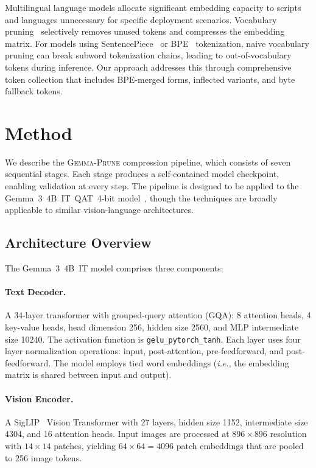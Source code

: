 \documentclass[11pt]{article}
\newcommand{\ie}{\textit{i.e.}}
\newcommand{\gemma}{\textsc{Gemma-Prune}}
\begin{document}
Multilingual language models allocate significant embedding capacity to scripts and languages unnecessary for specific deployment scenarios. Vocabulary pruning~\citep{vocabpruning} selectively removes unused tokens and compresses the embedding matrix. For models using SentencePiece~\citep{sentencepiece} or BPE~\citep{bpe} tokenization, naive vocabulary pruning can break subword tokenization chains, leading to out-of-vocabulary tokens during inference. Our approach addresses this through comprehensive token collection that includes BPE-merged forms, inflected variants, and byte fallback tokens.

\section{Method}
\label{sec:method}

We describe the \gemma{} compression pipeline, which consists of seven sequential stages. Each stage produces a self-contained model checkpoint, enabling validation at every step. The pipeline is designed to be applied to the Gemma~3~4B~IT~QAT~4-bit model~\citep{gemma3}, though the techniques are broadly applicable to similar vision-language architectures.

\subsection{Architecture Overview}
\label{sec:arch}

The Gemma~3~4B~IT model comprises three components:

\paragraph{Text Decoder.} A 34-layer transformer with grouped-query attention (GQA): 8 attention heads, 4 key-value heads, head dimension 256, hidden size 2560, and MLP intermediate size 10240. The activation function is \texttt{gelu\_pytorch\_tanh}. Each layer uses four layer normalization operations: input, post-attention, pre-feedforward, and post-feedforward. The model employs tied word embeddings (\ie, the embedding matrix is shared between input and output).

\paragraph{Vision Encoder.} A SigLIP~\citep{siglip} Vision Transformer with 27 layers, hidden size 1152, intermediate size 4304, and 16 attention heads. Input images are processed at $896\times896$ resolution with $14\times14$ patches, yielding $64\times64 = 4096$ patch embeddings that are pooled to 256 image tokens.
\end{document}
